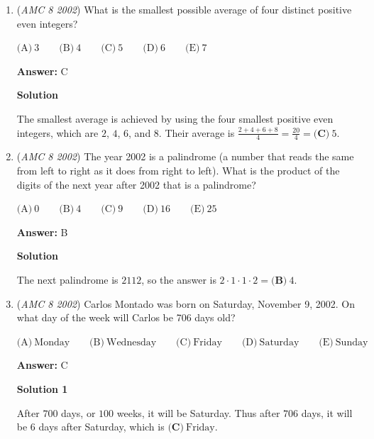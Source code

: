 \begin{enumerate}
 If no $\$5$ bills are used, the $\$2$ bills must total to $\$17$, which is impossible since $17$ is odd.

 Thus there are $\boxed {\textbf{(A)}\ 2}$ such combinations of bills that total to $\$17$.

 


 


	\item (\textit{AMC 8 2002}) What is the smallest possible average of four distinct positive even integers?


 $\text{(A)}\ 3 \qquad \text{(B)}\ 4 \qquad \text{(C)}\ 5 \qquad \text{(D)}\ 6 \qquad \text{(E)}\ 7$

 \textbf{Answer: }C



\textbf{Solution}

The smallest average is achieved by using the four smallest positive even integers, which are $2$, $4$, $6$, and $8$. Their average is $\frac{2+4+6+8}{4}=\frac{20}{4}=\boxed{\textbf{(C)}\ 5}$.

 


	\item (\textit{AMC 8 2002}) The year 2002 is a palindrome (a number that reads the same from left to right as it does from right to left). What is the product of the digits of the next year after 2002 that is a palindrome?


 $\text{(A)}\ 0 \qquad \text{(B)}\ 4 \qquad \text{(C)}\ 9 \qquad \text{(D)}\ 16 \qquad \text{(E)}\ 25$

 \textbf{Answer: }B



\textbf{Solution}

The next palindrome is $2112$, so the answer is $2 \cdot 1 \cdot 1 \cdot 2 = \boxed{\textbf{(B)}\ 4}$.

 


	\item (\textit{AMC 8 2002}) Carlos Montado was born on Saturday, November 9, 2002. On what day of the week will Carlos be 706 days old?


 $\text{(A)}\ \text{Monday} \qquad \text{(B)}\ \text{Wednesday} \qquad \text{(C)}\ \text{Friday} \qquad \text{(D)}\ \text{Saturday} \qquad \text{(E)}\ \text{Sunday}$

 \textbf{Answer: }C



\textbf{Solution 1}

After $700$ days, or $100$ weeks, it will be Saturday.  Thus after $706$ days, it will be $6$ days after Saturday, which is $\boxed{\textbf{(C)}\ \text{Friday}}$.


\end{enumerate}
